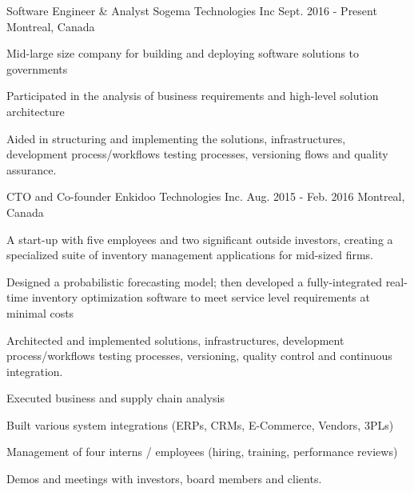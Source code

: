 

\begin{cventries}

  \cventry
    {Software Engineer \& Analyst} %
    {Sogema Technologies Inc} %
    {Sept. 2016 - Present} %
    {Montreal, Canada} %
    {
      \begin{cvitems} %
        \item {Mid-large size company for building and deploying software solutions to governments}
        \item {Participated in the analysis of business requirements and high-level solution architecture}
        \item {Aided in structuring and implementing the solutions, infrastructures, development process/workflows testing processes, versioning flows and quality assurance.}
      \end{cvitems}
    }

  \cventry
    {CTO and Co-founder} %
    {Enkidoo Technologies Inc.} %
    {Aug. 2015 - Feb. 2016} %
    {Montreal, Canada} %
    {
      \begin{cvitems} %
      	\item{ A start-up with five employees and two significant outside investors, creating a specialized suite of inventory management applications for mid-sized firms. }
        \item{ Designed a probabilistic forecasting model; then developed a fully-integrated real-time inventory optimization software to meet service level requirements at minimal costs  }
        \item{ Architected and implemented solutions, infrastructures, development process/workflows testing processes, versioning, quality control and continuous integration. }
        \item{ Executed business and supply chain analysis }
        \item{ Built various system integrations (ERPs, CRMs, E-Commerce, Vendors, 3PLs) }
        \item{ Management of four interns / employees (hiring, training, performance reviews)  }
        \item{ Demos and meetings with investors, board members and clients. }
      \end{cvitems}
    }


\end{cventries}
